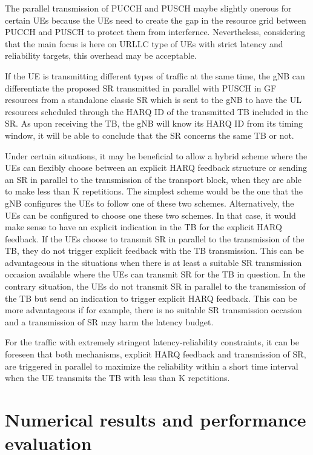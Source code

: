 \documentclass[conference]{IEEEtran}
\begin{document}
The parallel transmission of PUCCH and PUSCH maybe slightly onerous for certain UEs because the UEs need to create the gap in the resource grid between PUCCH and PUSCH to protect them from interfernce. Nevertheless, considering that the main focus is here on URLLC type of UEs with strict latency and reliability targets, this overhead may be acceptable.

If the UE is transmitting different types of traffic at the same time, the gNB can differentiate the proposed SR transmitted in parallel with PUSCH in GF resources from a standalone classic SR which is sent to the gNB to have the UL resources scheduled through the HARQ ID of the transmitted TB included in the SR. As upon receiving the TB, the gNB will know its HARQ ID from its timing window, it will be able to conclude that the SR concerns the same TB or not.

Under certain situations, it may be beneficial to allow a hybrid scheme where the UEs can flexibly choose between an explicit HARQ feedback structure or sending an SR in parallel to the transmission of the transport block, when they are able to make less than K repetitions. The simplest scheme would be the one that the gNB configures the UEs to follow one of these two schemes. Alternatively, the UEs can be configured to choose one these two schemes. In that case, it would make sense to have an explicit indication in the TB for the explicit HARQ feedback. If the UEs choose to transmit SR in parallel to the transmission of the TB, they do not trigger explicit feedback with the TB transmission. This can be advantageous in the situations when there is at least a suitable SR transmission occasion available where the UEs can transmit SR for the TB in question. In the contrary situation, the UEs do not transmit SR in parallel to the transmission of the TB but send an indication to trigger explicit HARQ feedback. This can be more advantageous if for example, there is no suitable SR transmission occasion and a transmission of SR may harm the latency budget.

For the traffic with extremely stringent latency-reliability constraints, it can be foreseen that both mechanisms, explicit HARQ feedback and transmission of SR, are triggered in parallel to maximize the reliability within a short time interval when the UE transmits the TB with less than K repetitions.

\section{Numerical results and performance evaluation}\label{IV}
\end{document}
